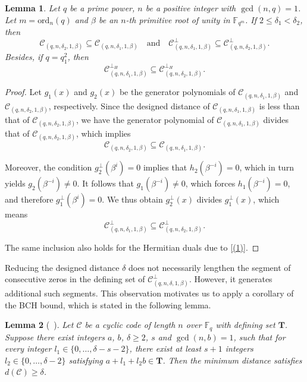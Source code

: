 \documentclass[journal,12pt,onecolumn]{IEEEtran}
\newtheorem{lemma}{Lemma}
\begin{document}
\begin{lemma}
    \label{contain}
    Let $q$ be a prime power, $n$ be a positive integer with $\gcd(n,q)=1$. Let $m=\text{ord}_n(q)$ and $\beta$ be an $n$-th primitive root of unity in $\mathbb{F}_{q^m}$. If $2\le\delta_1<\delta_2$,
    then
    \[
    \mathcal{C}_{(q,n,\delta_2,1,\beta)}\subseteq\mathcal{C}_{(q,n,\delta_1,1,\beta)}
    \quad \text{and} \quad
    \mathcal{C}^\perp_{(q,n,\delta_1,1,\beta)}\subseteq\mathcal{C}^\perp_{(q,n,\delta_2,1,\beta)}.
    \]
    Besides, if $q=q_1^2$, then \[\mathcal{C}^{\perp_H}_{(q,n,\delta_1,1,\beta)}\subseteq\mathcal{C}^{\perp_H}_{(q,n,\delta_2,1,\beta)}.\]
\end{lemma}

\begin{proof}
Let $g_1(x)$ and $g_2(x)$ be the generator polynomials of $\mathcal{C}_{(q,n,\delta_1,1,\beta)}$ and $\mathcal{C}_{(q,n,\delta_2,1,\beta)}$, respectively. Since the designed distance of $\mathcal{C}_{(q,n,\delta_1,1,\beta)}$ is less than that of $\mathcal{C}_{(q,n,\delta_2,1,\beta)}$, we have the generator polynomial of $\mathcal{C}_{(q,n,\delta_1,1,\beta)}$ divides that of $\mathcal{C}_{(q,n,\delta_2,1,\beta)}$, which implies
\[
\mathcal{C}_{(q,n,\delta_2,1,\beta)} \subseteq \mathcal{C}_{(q,n,\delta_1,1,\beta)}.
\]

Moreover, the condition
\(
g_2^\perp(\beta^i) = 0 \) implies that $h_2(\beta^{-i}) = 0$, which in turn yields $g_2(\beta^{-i}) \ne 0$.
It follows that $g_1(\beta^{-i}) \ne 0$, which forces $h_1(\beta^{-i}) = 0$, and therefore $g_1^\perp(\beta^i) = 0$. We thus obtain $g_2^\perp(x)$ divides $g_1^\perp(x)$, which means
\[
\mathcal{C}^\perp_{(q,n,\delta_1,1,\beta)} \subseteq \mathcal{C}^\perp_{(q,n,\delta_2,1,\beta)}.
\]

The same inclusion also holds for the Hermitian duals due to \eqref{(1)}.
\end{proof}

Reducing the designed distance $\delta$ does not necessarily lengthen the segment of consecutive zeros in the defining set of $\mathcal{C}^\perp_{(q,n,\delta,1,\beta)}$. However, it generates additional such segments. This observation motivates us to apply a corollary of the BCH bound, which is stated in the following lemma.

\begin{lemma}[~\cite{Blahut2003Algebraic}]
\label{Roos bound}
Let $\mathcal{C}$ be a cyclic code of length $n$ over $\mathbb{F}_q$ with defining set $\mathbf{T}$.
Suppose there exist integers $a$, $b$, $\delta\ge 2$, $s$ and $\gcd(n,b)=1$, such that for every integer $l_1\in \{0,\dots,\delta-s-2\}$, there exist at least $s+1$ integers $l_2\in\{0,\dots,\delta-2\}$ satisfying $a+l_1+l_2b\in \textbf{T}$. Then the minimum distance satisfies $d(\mathcal{C})\ge \delta$.
\end{lemma}
\end{document}
